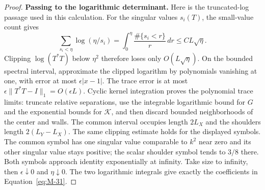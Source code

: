 \begin{proof}
\par\smallskip\noindent\textbf{Passing to the logarithmic determinant.}
Here is the truncated-log passage used in this calculation. For the
singular values $s_i(T)$, the small-value count gives
\[
 \sum_{s_i<\eta}\log(\eta/s_i)
 =\int_0^\eta\frac{\#\{s_i<r\}}r\,dr\le CL\sqrt\eta.
\]
Clipping $\log(T^*T)$ below $\eta^2$ therefore loses only
$O(L\sqrt\eta)$. On the bounded spectral interval, approximate the
clipped logarithm by polynomials vanishing at one, with error at most
$\epsilon|x-1|$. The trace error is at most
$\epsilon\|T^*T-I\|_1=O(\epsilon L)$. Cyclic kernel integration
proves the polynomial trace limits: truncate relative separations,
use the integrable logarithmic bound for $G$ and the exponential bounds
for $\mathscr K$, and then discard bounded neighborhoods of the center
and walls. The common interval occupies length $2L_X$ and the
shoulders length $2(L_Y-L_X)$. The same clipping estimate holds for
the displayed symbols. The common symbol has one singular value
comparable to $k^2$ near zero and its other singular value stays
positive; the scalar shoulder symbol tends to $3/8$ there. Both
symbols approach identity exponentially at infinity.
Take size to infinity, then $\epsilon\downarrow0$ and
$\eta\downarrow0$. The two logarithmic integrals give exactly the
coefficients in Equation~\eqref{eq:M-31}.


\end{proof}
